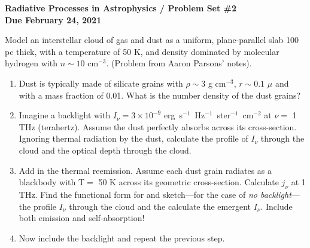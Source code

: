 \documentclass[11pt, preprint]{article}
\begin{document}
\begin{center}
  {\bf Radiative Processes in Astrophysics / Problem Set \#2 \\
    Due February 24, 2021}
\end{center}

\noindent Model an interstellar cloud of gas and dust as a uniform,
  plane-parallel slab 100 pc thick, with a temperature of 50 K, and
  density dominated by molecular hydrogen with $n \sim 10$
  cm$^{-3}$. (Problem from Aaron Parsons' notes).
\begin{enumerate}
\item Dust is typically made of silicate grains with $\rho \sim 3$ g
  cm$^{-3}$, $r\sim 0.1$ $\mu$ and with a mass fraction of 0.01. What
  is the number density of the dust grains?
\item Imagine a backlight with $I_\nu = 3\times 10^{-9}$
  erg~s$^{-1}$~Hz$^{-1}$~ster$^{-1}$~cm$^{-2}$ at $\nu =$ 1 THz
  (terahertz). Assume the dust perfectly absorbs across its
  cross-section. Ignoring thermal radiation by the dust, calculate
  the profile of $I_\nu$ through the cloud and the optical depth
  through the cloud.
\item Add in the thermal reemission. Assume each dust grain radiates
  as a blackbody  with T$=$ 50 K across its geometric
  cross-section. Calculate $j_\nu$ at 1 THz. Find the functional form
  for and sketch---for the case of {\it no backlight}---the 
  profile $I_\nu$ through the cloud and the calculate the emergent
  $I_\nu$. Include both emission and self-absorption!
\item Now include the backlight and repeat the previous step.
\end{enumerate}
\end{document}
